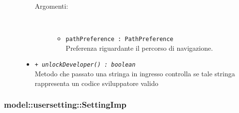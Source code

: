 \documentclass[../DefinizioneDiProdotto.tex]{subfiles}
\begin{document}
\begin{description}
\begin{itemize}
 \begin{description}
\item[Argomenti:] \
\begin{itemize}
\item \texttt{pathPreference : PathPreference}\\
Preferenza riguardante il percorso di navigazione.\end{itemize}
\end{description}
\item \texttt{+ \textit{unlockDeveloper() : boolean}}\\
Metodo che passato una stringa in ingresso controlla se tale stringa rappresenta un codice sviluppatore valido
 \end{itemize}
\end{description}

\subsubsection{model::usersetting::SettingImp}
\end{document}
